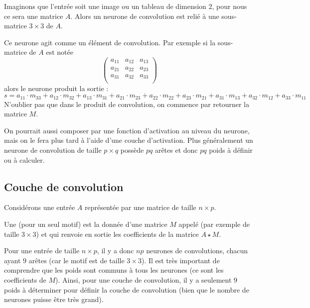\documentclass[11pt,class=report,crop=false]{standalone}
\begin{document}
Imaginons que l'entrée soit une image ou un tableau de dimension $2$, pour nous ce sera une matrice $A$. Alors un neurone de convolution est relié à une sous-matrice $3 \times 3$ de $A$.



Ce neurone agit comme un élément de convolution. Par exemple si la sous-matrice de $A$
est notée 
$$\begin{pmatrix}
a_{11} & a_{12} & a_{13} \\
a_{21} & a_{22} & a_{23} \\
a_{31} & a_{32} & a_{33} \\
\end{pmatrix}$$
alors le neurone produit la sortie :
$$s = 
a_{11} \cdot m_{33} +
a_{12} \cdot m_{32} +
a_{13} \cdot m_{31} +
a_{21} \cdot m_{23} +
a_{22} \cdot m_{22} +
a_{23} \cdot m_{21} +
a_{31} \cdot m_{13} +
a_{32} \cdot m_{12} +
a_{33} \cdot m_{11}
$$
N'oublier pas que dans le produit de convolution, on commence par retourner la matrice $M$.




On pourrait aussi composer par une fonction d'activation au niveau du neurone, mais on le fera plus tard à l'aide d'une \og{}couche d'activation\fg{}.
Plus généralement un neurone de convolution de taille $p\times q$ possède $pq$ arêtes et donc $pq$ poids à définir ou à calculer.



\subsection{Couche de convolution}

Considérons une entrée $A$ représentée par une matrice de taille $n\times p$.

Une  (pour un seul motif) est la donnée d'une matrice $M$ appelé  (par exemple de taille $3\times 3$) et qui renvoie en sortie les coefficients de la matrice $A \star M$.

  
Pour une entrée de taille $n\times p$, il y a donc $np$ neurones de convolutions, chacun ayant $9$ arêtes (car le motif est de taille $3\times 3$). Il est très important de comprendre que les poids sont communs à tous les neurones (ce sont les coefficients de $M$).
Ainsi, pour une couche de convolution, il y a seulement $9$ poids à déterminer pour définir la couche de convolution (bien que le nombre de neurones puisse être très grand).
\end{document}
